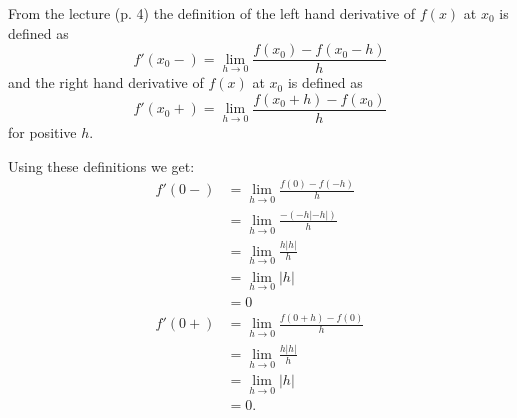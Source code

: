 \begin{derivation}
  From the lecture (p. 4) the definition of the left hand derivative of $f(x)$ at $x_0$ is defined as
  \begin{equation*}
    f'(x_0-) = \lim_{h \to 0} \frac{f(x_0) - f(x_0 - h)}{h}
  \end{equation*}
  and the right hand derivative of $f(x)$ at $x_0$ is defined as
  \begin{equation*}
    f'(x_0+) = \lim_{h \to 0} \frac{f(x_0 + h) - f(x_0)}{h}
  \end{equation*}
  for positive $h$.

  Using these definitions we get:
  \begin{align*}
    f'(0 - )&= \lim_{h \to 0} \frac{f(0) - f(-h)}{h} \\
    &= \lim_{h \to 0} \frac{- \left( -h \left| -h \right| \right)}{h} \\
    &= \lim_{h \to 0} \frac{h \left| h \right|}{h} \\
    &= \lim_{h \to 0} \left| h \right| \\
    &= 0 \\
    f'(0+) &= \lim_{h \to 0} \frac{f(0+h) - f(0)}{h} \\
    &= \lim_{h \to 0} \frac{h \left| h \right|}{h} \\
    &= \lim_{h \to 0} \left| h \right| \\
    &= 0
  .\end{align*}
\end{derivation}

